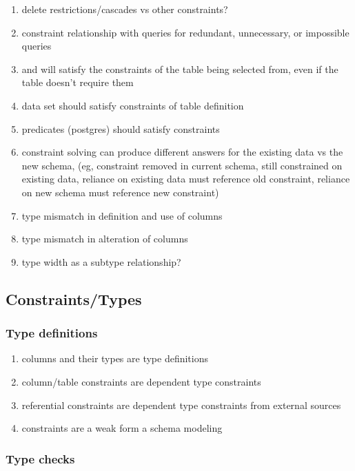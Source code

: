 \documentclass[12pt]{article}
\begin{document}
\begin{enumerate}
  \item delete restrictions/cascades vs other constraints?
  \item constraint relationship with queries for redundant, unnecessary, or impossible queries
  \item {} and  will satisfy the constraints of the table being selected from, even if the table doesn't require them
  \item {} data set should satisfy constraints of table definition
  \item {} predicates (postgres) should satisfy constraints
  \item constraint solving can produce different answers for the existing data vs the new schema, (eg, constraint removed in current schema, still constrained on existing data, reliance on existing data must reference old constraint, reliance on new schema must reference new constraint)
  \item type mismatch in definition and use of columns
  \item type mismatch in alteration of columns
  \item type width as a subtype relationship?
\end{enumerate}

\subsection{Constraints/Types}

\subsubsection{Type definitions}

\begin{enumerate}
  \item columns and their types are type definitions
  \item column/table constraints are dependent type constraints
  \item referential constraints are dependent type constraints from external sources
  \item constraints are a weak form a schema modeling
\end{enumerate}

\subsubsection{Type checks}
\end{document}
